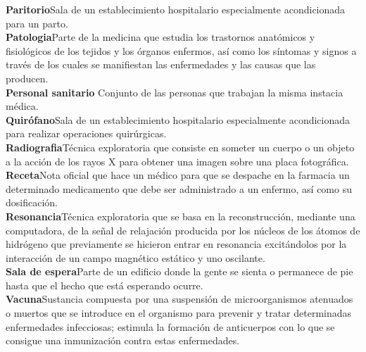 \documentclass[12pt,a4paper]{article}
\newcommand{\term}[2]{\textbf{#1}\quad#2\\}
\begin{document}
	\term{Paritorio}{Sala de un establecimiento hospitalario especialmente acondicionada para un parto.}
	\term{Patologia}{Parte de la medicina que estudia los trastornos anatómicos y fisiológicos de los tejidos y los órganos enfermos, así como los síntomas y signos a través de los cuales se manifiestan las enfermedades y las causas que las producen.}
	\term{Personal sanitario }{Conjunto de las personas que trabajan la misma instacia médica.}
	\term{Quirófano}{Sala de un establecimiento hospitalario especialmente acondicionada para realizar operaciones quirúrgicas.}
	\term{Radiografia}{Técnica exploratoria que consiste en someter un cuerpo o un objeto a la acción de los rayos X para obtener una imagen sobre una placa fotográfica.}
	\term{Receta}{Nota oficial que hace un médico para que se despache en la farmacia un determinado medicamento que debe ser administrado a un enfermo, así como su dosificación.}
	\term{Resonancia}{Técnica exploratoria que se basa en la reconstrucción, mediante una computadora, de la señal de relajación producida por los núcleos de los átomos de hidrógeno que previamente se hicieron entrar en resonancia excitándolos por la interacción de un campo magnético estático y uno oscilante.}
	\term{Sala de espera}{Parte de un edificio donde la gente se sienta o permanece de pie hasta que el hecho que está esperando ocurre.}
	\term{Vacuna}{Sustancia compuesta por una suspensión de microorganismos atenuados o muertos que se introduce en el organismo para prevenir y tratar determinadas enfermedades infecciosas; estimula la formación de anticuerpos con lo que se consigue una inmunización contra estas enfermedades.}


	
\end{document}
